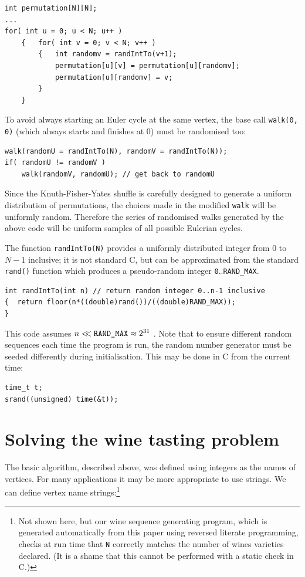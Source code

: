 \documentclass[12pt]{article}
\begin{document}
\begin{verbatim}
int permutation[N][N];
...
for( int u = 0; u < N; u++ )
    {   for( int v = 0; v < N; v++ )
        {   int randomv = randIntTo(v+1);
            permutation[u][v] = permutation[u][randomv];
            permutation[u][randomv] = v;
        }
    }
\end{verbatim}

To avoid always starting an Euler cycle at the same vertex, the base call \texttt{walk(0, 0)} (which always starts and finishes at 0) must be randomised too:

\begin{verbatim}
walk(randomU = randIntTo(N), randomV = randIntTo(N));
if( randomU != randomV )
    walk(randomV, randomU); // get back to randomU
\end{verbatim}

Since the Knuth-Fisher-Yates shuffle is carefully designed to generate a uniform distribution of permutations, the choices made in the modified \texttt{walk} will be uniformly random. Therefore the series of randomised walks generated by the above code will be uniform samples of all possible Eulerian cycles.

The function \texttt{randIntTo(N)} provides a uniformly distributed integer from $0$ to $N-1$ inclusive; it is not standard C, but can be approximated from the standard \texttt{rand()} function which produces a pseudo-random integer \texttt{0}..\texttt{RAND\_MAX}. 

\begin{verbatim}
int randIntTo(int n) // return random integer 0..n-1 inclusive
{  return floor(n*((double)rand())/((double)RAND_MAX));
}
\end{verbatim}

This code assumes $n<\!\!<\mbox{\tt RAND\_MAX}\approx 2^{31}$ \cite[p119]{knuth2}. Note that to ensure different random sequences each time the program is run, the random number generator must be seeded differently during initialisation. This may be done in C from the current time:

\begin{verbatim}
time_t t;
srand((unsigned) time(&t)); 
\end{verbatim}

\section{Solving the wine tasting problem}
The basic algorithm, described above, was defined using integers as the names of vertices. For many applications it may be more appropriate to use strings. We can define vertex name strings:\footnote{Not shown here, but our wine sequence generating program, which is generated automatically from this paper using reversed literate programming, checks at run time that \texttt{N} correctly matches the number of wines varieties declared. (It is a shame that this cannot be performed with a static check in C.)}
\end{document}
